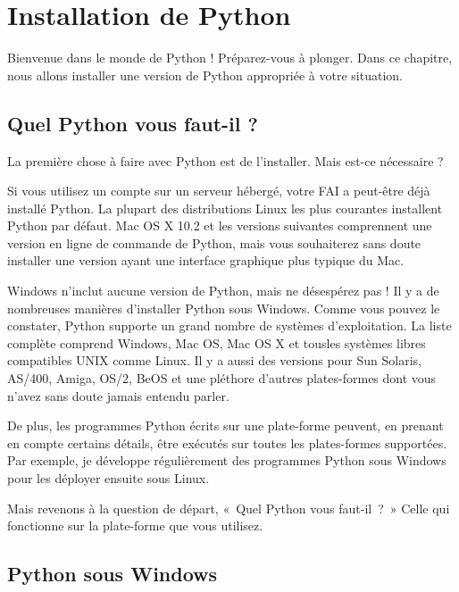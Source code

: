 \chapter{Installation de Python}\label{Installation de Python}

Bienvenue dans le monde de Python ! Préparez-vous à plonger. Dans ce chapitre, nous allons installer une version de Python appropriée à votre situation.

\section{Quel Python vous faut-il ?} \label{QuelPythonVousFautil}

La première chose à faire avec Python est de l'installer. Mais est-ce nécessaire ?

\medskip
Si vous utilisez un compte sur un serveur hébergé, votre FAI a peut-être déjà installé Python. La plupart des distributions Linux les plus courantes installent Python par défaut. Mac OS X 10.2 et les versions suivantes comprennent une version en ligne de commande de Python, mais vous souhaiterez sans doute installer une version ayant une interface graphique plus typique du Mac.

Windows n'inclut aucune version de Python, mais ne désespérez pas ! Il y a de nombreuses manières d'installer Python sous Windows. Comme vous pouvez le constater, Python supporte un grand nombre de systèmes d'exploitation. La liste complète comprend Windows, Mac OS, Mac OS X et tousles systèmes libres compatibles UNIX comme Linux. Il y a aussi des versions pour Sun Solaris, AS/400, Amiga, OS/2, BeOS et une pléthore d'autres plates-formes dont vous n'avez sans doute jamais entendu parler.

De plus, les programmes Python écrits sur une plate-forme peuvent, en prenant en compte certains détails, être exécutés sur toutes les plates-formes supportées. Par exemple, je développe régulièrement des programmes Python sous Windows pour les déployer ensuite sous Linux.

\medskip
Mais revenons à la question de départ, «~Quel Python vous faut-il~?~» Celle qui fonctionne sur la plate-forme que vous utilisez.

\section {Python sous Windows}\label{Python sous Windows}

